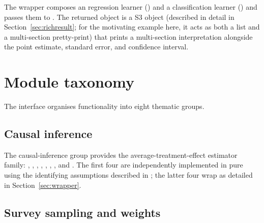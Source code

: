 \documentclass[article,shortnames,nojss]{jss}
\begin{document}

\noindent The  wrapper composes an
 regression learner () and a
classification learner () and passes
them to . The returned object is a
 S3 object (described in detail in
Section~\ref{sec:richresult}; for the motivating example here, it acts
as both a list and a multi-section pretty-print) that prints a
multi-section interpretation alongside the point estimate, standard
error, and confidence interval.

\section{Module taxonomy}
\label{sec:taxonomy}

The   interface organises functionality
into eight thematic groups.

\subsection{Causal inference}

The causal-inference group provides the average-treatment-effect
estimator family: , ,
, ,
, ,
, and . The first four
are independently implemented in pure  using the
identifying assumptions described in \citet{Ruhela2026MRM}; the
latter four wrap  as detailed in
Section~\ref{sec:wrapper}.

\subsection{Survey sampling and weights}
\end{document}
